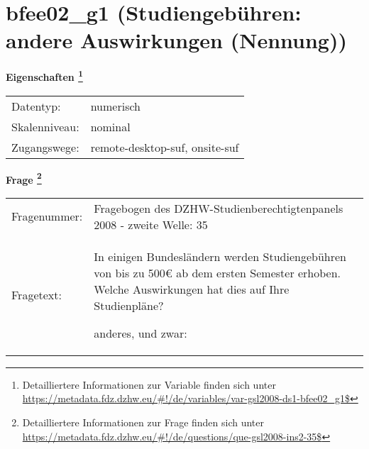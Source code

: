 
    \setcounter{footnote}{0}

    \vspace*{-1.8cm}
	\section{bfee02\_g1 (Studiengebühren: andere Auswirkungen (Nennung))}
	\label{section:bfee02_g1}



    \vspace*{0.5cm}
    \noindent\textbf{Eigenschaften
	\footnote{Detailliertere Informationen zur Variable finden sich unter
		\url{https://metadata.fdz.dzhw.eu/\#!/de/variables/var-gsl2008-ds1-bfee02_g1$}}}\\
	\begin{tabularx}{\hsize}{@{}lX}
	Datentyp: & numerisch \\
	Skalenniveau: & nominal \\
	Zugangswege: &
	  remote-desktop-suf, 
	  onsite-suf
 \\
    \end{tabularx}



				\vspace*{0.5cm}
                \noindent\textbf{Frage
	                \footnote{Detailliertere Informationen zur Frage finden sich unter
		              \url{https://metadata.fdz.dzhw.eu/\#!/de/questions/que-gsl2008-ins2-35$}}}\\
				\begin{tabularx}{\hsize}{@{}lX}
					Fragenummer: &
					  Fragebogen des DZHW-Studienberechtigtenpanels 2008 - zweite Welle:
					  35
 \\
					Fragetext: & In einigen Bundesländern werden Studiengebühren von bis zu 500€ ab dem ersten Semester erhoben. Welche Auswirkungen hat dies auf Ihre Studienpläne?\par  anderes, und zwar: \\
				\end{tabularx}





